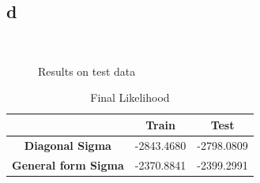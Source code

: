 \documentclass[12pt]{article}
\begin{document}
\subsection*{d}
\begin{figure} [H]
\centering
   \\
  \caption{Results on test data} 
  \label{fig:3d}
\end{figure}

\begin{table}[H]
\centering
	\begin{tabular}{c|c|c|} 
	\cline{2-3}
	& \multicolumn{1}{c|}{\cellcolor[gray]{0.7} \textbf{Train}}  
	& \multicolumn{1}{c|}{\cellcolor[gray]{0.7} \textbf{Test}}
	\\ \hline
	
	\multicolumn{1}{|c|}{\cellcolor[gray]{0.8} \textbf{Diagonal Sigma}}   & -2843.4680 & -2798.0809 \\ \hline
	\multicolumn{1}{|c|}{\cellcolor[gray]{0.8} \textbf{General form Sigma}}   & -2370.8841
	 & -2399.2991 \\ \hline
	
	\end{tabular} 
	\caption{Final Likelihood}
	\label{tab:Likelihood}
\end{table}
\end{document}
